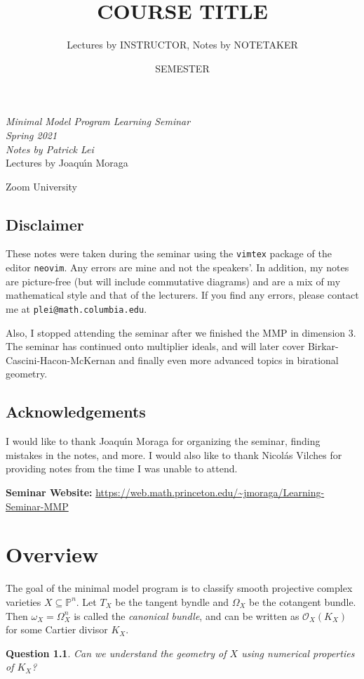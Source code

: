 \documentclass[leqno, openany]{memoir}
\title{COURSE TITLE}
\author{Lectures by INSTRUCTOR, Notes by NOTETAKER}
\date{SEMESTER}
\newtheorem{quest}[thm]{Question}
\theoremstyle{definition}
\theoremstyle{remark}
\theoremstyle{plain}
\theoremstyle{definition}
\theoremstyle{remark}
\renewcommand{\P}{\mathbb{P}}
\newcommand{\mc}[1]{\mathcal{#1}}
\newcommand*{\titleSW}
    {\begingroup%
    \raggedleft
    \vspace*{\baselineskip}
    {\Huge\itshape Minimal Model Program Learning Seminar \\ Spring 2021}\\[\baselineskip]
    {\large\itshape Notes by Patrick Lei}\\[0.2\textheight]
    {\Large Lectures by Joaqu\'{\i}n Moraga}\par
    \vfill
    {\Large \sffamily Zoom University}
    \vspace*{\baselineskip}
\endgroup}
\begin{document}
    
\begin{titlingpage}
\titleSW
\end{titlingpage}

\thispagestyle{empty}
\section*{Disclaimer}%
\label{sec:disclaimer}

These notes were taken during the seminar using the \texttt{vimtex} package of the editor \texttt{neovim}. 
Any errors are mine and not the speakers'. 
In addition, my notes are picture-free (but will include commutative diagrams) and are a mix of my mathematical style and that of the lecturers.
If you find any errors, please contact me at \texttt{plei@math.columbia.edu}.

Also, I stopped attending the seminar after we finished the MMP in dimension $3$. The seminar has continued onto multiplier ideals, and will later cover Birkar-Cascini-Hacon-McKernan and finally even more advanced topics in birational geometry.

\section*{Acknowledgements}%
\label{sec:acknowledgements}

I would like to thank Joaqu\'{\i}n Moraga for organizing the seminar, finding mistakes in the notes, and more. I would also like to thank Nicol\'as Vilches for providing notes from the time I was unable to attend.

\vspace*{1cm}

\noindent\textbf{Seminar Website:}  \url{https://web.math.princeton.edu/~jmoraga/Learning-Seminar-MMP}
\newpage


\tableofcontents

\chapter{Overview}%
\label{cha:overview}

The goal of the minimal model program is to classify smooth projective complex varieties $X \subseteq \P^n$. Let $T_X$ be the tangent byndle and $\Omega_X$ be the cotangent bundle. Then $\omega_X = \Omega_X^n$ is called the \textit{canonical bundle}, and can be written as $\mc{O}_X(K_X)$ for some Cartier divisor $K_X$.

\begin{quest}
    Can we understand the geometry of $X$ using numerical properties of $K_X$?
\end{quest}
\end{document}
